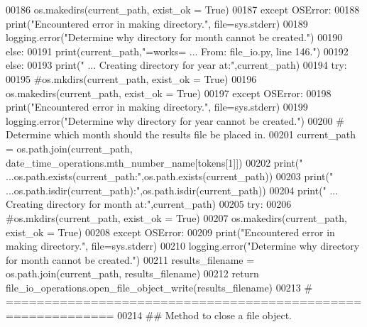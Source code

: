 \begin{DoxyCode}
00186                     os.makedirs(current\_path, exist\_ok = \textcolor{keyword}{True})
00187                 \textcolor{keywordflow}{except} OSError:
00188                     print(\textcolor{stringliteral}{"Encountered error in making directory."}, file=sys.stderr)
00189                     logging.error(\textcolor{stringliteral}{"Determine why directory for month cannot be created."})
00190             \textcolor{keywordflow}{else}:
00191                 print(current\_path,\textcolor{stringliteral}{"=works= ... From: file\_io.py, line 146."})
00192         \textcolor{keywordflow}{else}:
00193             print(\textcolor{stringliteral}{" ... Creating directory for year at:"},current\_path)
00194             \textcolor{keywordflow}{try}:
00195                 \textcolor{comment}{#os.mkdirs(current\_path, exist\_ok = True)}
00196                 os.makedirs(current\_path, exist\_ok = \textcolor{keyword}{True})
00197             \textcolor{keywordflow}{except} OSError:
00198                 print(\textcolor{stringliteral}{"Encountered error in making directory."}, file=sys.stderr)
00199                 logging.error(\textcolor{stringliteral}{"Determine why directory for year cannot be created."})
00200             \textcolor{comment}{# Determine which month should the results file be placed in.}
00201             current\_path = os.path.join(current\_path, date\_time\_operations.mth\_number\_name[tokens[1]])
00202             print(\textcolor{stringliteral}{" ...os.path.exists(current\_path:"},os.path.exists(current\_path))
00203             print(\textcolor{stringliteral}{" ...os.path.isdir(current\_path):"},os.path.isdir(current\_path))
00204             print(\textcolor{stringliteral}{" ... Creating directory for month at:"},current\_path)
00205             \textcolor{keywordflow}{try}:
00206                 \textcolor{comment}{#os.mkdirs(current\_path, exist\_ok = True)}
00207                 os.makedirs(current\_path, exist\_ok = \textcolor{keyword}{True})
00208             \textcolor{keywordflow}{except} OSError:
00209                 print(\textcolor{stringliteral}{"Encountered error in making directory."}, file=sys.stderr)
00210                 logging.error(\textcolor{stringliteral}{"Determine why directory for month cannot be created."})
00211         results\_filename = os.path.join(current\_path, results\_filename)
00212         \textcolor{keywordflow}{return} file\_io\_operations.open\_file\_object\_write(results\_filename)
00213     \textcolor{comment}{# ============================================================}
00214     \textcolor{comment}{##  Method to close a file object.}

\end{DoxyCode}
